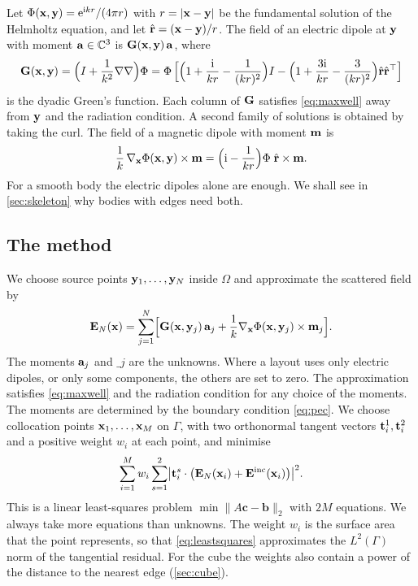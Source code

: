 Let $\Phi(\mathbf{x},\mathbf{y}) = \mathrm{e}^{\mathrm{i} k r}/(4\pi r)$ with $r = |\mathbf{x}-\mathbf{y}|$ be the fundamental solution of the Helmholtz equation, and let $\hat{\mathbf{r}} = (\mathbf{x}-\mathbf{y})/r$. The field of an electric dipole at $\mathbf{y}$ with moment $\mathbf{a}\in\mathbb{C}^3$ is $\mathbf{G}(\mathbf{x},\mathbf{y})\,\mathbf{a}$, where
\begin{equation}
  \mathbf{G}(\mathbf{x},\mathbf{y}) = \Bigl(I + \frac{1}{k^2}\nabla\nabla\Bigr)\Phi
  = \Phi\,\Bigl[\Bigl(1+\frac{\mathrm{i}}{kr}-\frac{1}{(kr)^2}\Bigr)I-\Bigl(1+\frac{3\mathrm{i}}{kr}-\frac{3}{(kr)^2}\Bigr)\hat{\mathbf{r}}\hat{\mathbf{r}}^{\top}\Bigr]
  \label{eq:dyadic}
\end{equation}
is the dyadic Green's function. Each column of $\mathbf{G}$ satisfies \eqref{eq:maxwell} away from $\mathbf{y}$ and the radiation condition. A second family of solutions is obtained by taking the curl. The field of a magnetic dipole with moment $\mathbf{m}$ is
\begin{equation}
  \frac{1}{k}\,\nabla_{\mathbf{x}}\Phi(\mathbf{x},\mathbf{y})\times\mathbf{m}
  = \Bigl(\mathrm{i}-\frac{1}{kr}\Bigr)\Phi\;\hat{\mathbf{r}}\times\mathbf{m} .
  \label{eq:magnetic}
\end{equation}
For a smooth body the electric dipoles alone are enough. We shall see in \autoref{sec:skeleton} why bodies with edges need both.

\subsection{The method}

We choose source points $\mathbf{y}_1,\dots,\mathbf{y}_N$ inside $\Omega$ and approximate the scattered field by
\begin{equation}
  \mathbf{E}_N(\mathbf{x}) = \sum_{j=1}^{N}\Bigl[\mathbf{G}(\mathbf{x},\mathbf{y}_j)\,\mathbf{a}_j + \frac{1}{k}\nabla_{\mathbf{x}}\Phi(\mathbf{x},\mathbf{y}_j)\times\mathbf{m}_j\Bigr].
  \label{eq:mfs}
\end{equation}
The moments $\mathbf{a}_j$ and $\bm_j$ are the unknowns. Where a layout uses only electric dipoles, or only some components, the others are set to zero. The approximation satisfies \eqref{eq:maxwell} and the radiation condition for any choice of the moments. The moments are determined by the boundary condition \eqref{eq:pec}. We choose collocation points $\mathbf{x}_1,\dots,\mathbf{x}_M$ on $\Gamma$, with two orthonormal tangent vectors $\mathbf{t}_i^{1},\mathbf{t}_i^{2}$ and a positive weight $w_i$ at each point, and minimise
\begin{equation}
  \sum_{i=1}^{M} w_i \sum_{s=1}^{2}\bigl|\mathbf{t}_i^{s}\cdot\bigl(\mathbf{E}_N(\mathbf{x}_i)+\mathbf{E}^{\mathrm{inc}}(\mathbf{x}_i)\bigr)\bigr|^2 .
  \label{eq:leastsquares}
\end{equation}
This is a linear least-squares problem $\min\|A\mathbf{c}-\mathbf{b}\|_2$ with $2M$ equations. We always take more equations than unknowns. The weight $w_i$ is the surface area that the point represents, so that \eqref{eq:leastsquares} approximates the $L^2(\Gamma)$ norm of the tangential residual. For the cube the weights also contain a power of the distance to the nearest edge (\autoref{sec:cube}).

